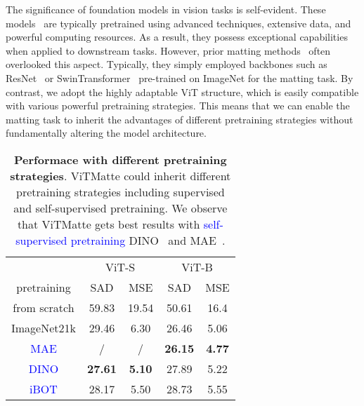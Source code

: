 \documentclass[10pt,twocolumn,letterpaper]{article}
\newcommand{\thename}{ViTMatte}
\begin{document}
The significance of foundation models in vision tasks is self-evident. These models~\cite{he2022masked, EVA, EVA02, dino, ibot} are typically pretrained using advanced techniques, extensive data, and powerful computing resources. As a result, they possess exceptional capabilities when applied to downstream tasks. However, prior matting methods~\cite{GCAMatting, MGM, matteformer, rmat} often overlooked this aspect. Typically, they simply employed backbones such as ResNet~\cite{res} or SwinTransformer~\cite{swin} pre-trained on ImageNet for the matting task. By contrast, we adopt the highly adaptable ViT structure, which is easily compatible with various powerful pretraining strategies. This means that we can enable the matting task to inherit the advantages of different pretraining strategies without fundamentally altering the model architecture.

\begin{table}[tbp]
    \centering
    \renewcommand{\arraystretch}{1.2}
    \begin{tabular}{c|cc|cc}
    \toprule
                     & \multicolumn{2}{c|}{ViT-S} & \multicolumn{2}{c}{ViT-B} \\
    pretraining      & SAD  & MSE & SAD  & MSE \\
    \midrule
    from scratch     & 59.83          & 19.54         & 50.61  & 16.4 \\
    ImageNet21k      & 29.46          & 6.30          & 26.46  & 5.06 \\
    \textcolor{blue}{MAE}              & /              &/              & \textbf{26.15} &\textbf{4.77} \\
    \textcolor{blue}{DINO}             & \textbf{27.61} &\textbf{5.10}  & 27.89  & 5.22 \\
    \textcolor{blue}{iBOT}             & 28.17          & 5.50          & 28.73  & 5.55 \\
    \bottomrule
    \end{tabular}
    \caption{\textbf{Performace with different pretraining strategies}. \thename{} could inherit different pretraining strategies including supervised and self-supervised pretraining. We observe that \thename{} gets best results with \textcolor{blue}{self-supervised pretraining} DINO~\cite{dino} and MAE~\cite{he2022masked}. }
    \label{pretraining}
\end{table}
\end{document}
